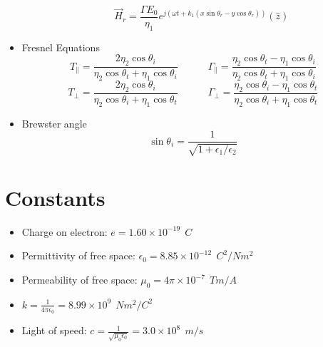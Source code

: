 \documentclass{article}
\begin{document}
\begin{itemize}
\begin{itemize}
			\[\vec{H}_{r}=\frac{\Gamma E_{0}}{\eta_{1}}e^{j(\omega t+k_{1}(x\sin\theta_{r}-y\cos\theta_{r}))}(\hat{z})\]
	\end{itemize}
	\item Fresnel Equations \[T_{\parallel}= \frac{2\eta_{2}\cos\theta_{i}}{\eta_{2}\cos\theta_{t}+\eta_{1}\cos\theta_{i}} \quad \quad \quad \Gamma_{\parallel} = \frac{\eta_{2}\cos\theta_{t}-\eta_{1}\cos\theta_{i}}{\eta_{2}\cos\theta_{t}+\eta_{1}\cos\theta_{i}}\] \[T_{\perp}= \frac{2\eta_{2}\cos\theta_{i}}{\eta_{2}\cos\theta_{i}+\eta_{1}\cos\theta_{t}} \quad \quad \quad \Gamma_{\perp} = \frac{\eta_{2}\cos\theta_{i}-\eta_{1}\cos\theta_{t}}{\eta_{2}\cos\theta_{i}+\eta_{1}\cos\theta_{t}}\]
	\item Brewster angle \[\sin\theta_{i}=\frac{1}{\sqrt{1+\epsilon_{1}/\epsilon_{2}}}\]
\end{itemize}


\section*{Constants}
\begin{itemize}
    \item Charge on electron: $e = 1.60 \times 10^{-19} \ \ C$
    \item Permittivity of free space: $\epsilon_{0} = 8.85 \times 10^{-12} \ \ C^{2}/Nm^{2}$
    \item Permeability of free space: $\mu_{0}  = 4\pi \times 10^{-7} \ \ Tm/A$
    \item $k = \frac{1}{4\pi \epsilon_{0}} = 8.99\times 10^{9} \ \ Nm^{2}/C^{2}$
    \item Light of speed: $c = \frac{1}{\sqrt{\mu_{0}\epsilon_{0}}} = 3.0\times 10^{8} \ \ m/s$
\end{itemize}


\vspace*{\fill}
\end{document}
